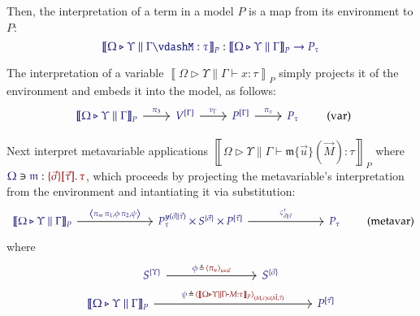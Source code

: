 \documentclass[11pt]{article}
\theoremstyle{definition}
\theoremstyle{remark}
\numberwithin{equation}{section}
\def\IModeColorName{MidnightBlue}
\def\OModeColorName{Maroon}
\newcommand\IMode[1]{{\color{\IModeColorName}{#1}}}
\newcommand\OMode[1]{{\color{\OModeColorName}{#1}}}
\newcommand\Of[2]{\IMode{#1}: \IMode{#2}}
\newcommand\MkValence[3]{%
  \ifthenelse{\equal{#1}{}}{}{%
    \{#1\}%
  }%
  \ifthenelse{\equal{#2}{}}{}{%
    [#2]%
  }.\, #3%
}
\newcommand\Lookup[3]{\IMode{#1}\ni\IMode{#2}:\OMode{#3}}
\newcommand\Tuple[1]{\left\langle#1 \right\rangle}
\newcommand\MV[1]{\mathfrak{#1}}
\newcommand\MApp[3]{#1\{#2\}(#3)}
\newcommand\Define[2]{\IMode{#1}\triangleq\OMode{#2}}
\newcommand\SemBrackets[1]{\left\llbracket#1\right\rrbracket}
\newcommand\Yoneda[1]{\boldsymbol{y} (#1)}
\begin{document}
Then, the interpretation of a term in a model $P$ is a map from its environment
to $P$:
\[%
  \Of{\SemBrackets{\Omega\triangleright\Upsilon\parallel\Gamma\vdash%
      M:\tau}_P}{\SemBrackets{\Omega\triangleright\Upsilon\parallel\Gamma}_P\to P_\tau}%
\]

The interpretation of a variable
$\SemBrackets{\Omega\triangleright\Upsilon\parallel\Gamma\vdash x:\tau}_P$ simply
projects it of the environment and embeds it into the model, as follows:
\[
  \begin{tikzcd}[ampersand replacement = \&]
    {\IMode{\SemBrackets{\Omega\triangleright\Upsilon\parallel\Gamma}_P}} \arrow[r, "\IMode{\pi_3}"]
    \& {\IMode{V^{[\Gamma]}}} \arrow[r, "\IMode{\nu_{\Gamma}}"]
    \& {\IMode{P^{[\Gamma]}}} \arrow[r, "\IMode{\pi_x}"]
    \& \IMode{P_\tau}
  \end{tikzcd}
  \tag{var}
\]

Next interpret metavariable applications
$\SemBrackets{\Omega\triangleright\Upsilon\parallel\Gamma\vdash\MApp{\MV{m}}{\vec{u}}{\vec{M}}
: \tau}_P$ where
$\Lookup{\Omega}{\MV{m}}{\MkValence{\vec{\sigma}}{\vec{\tau}}{\tau}}$, which
proceeds by projecting the metavariable's interpretation from the environment
and intantiating it via substitution:
\[
  \begin{tikzcd}[ampersand replacement = \&, sep=7em]
    {\IMode{\SemBrackets{\Omega\triangleright\Upsilon\parallel\Gamma}_P}}
          \arrow[r, "\IMode{\Tuple{\pi_\MV{m}\,\pi_1, \phi\,\pi_2, \psi}}"]
    \& {\IMode{P_{\tau}^{\Yoneda{\vec{\sigma}\parallel\vec{\tau}}}\times S^{\{\vec{\sigma}\}} \times P^{[\vec{\tau}]}}}
          \arrow[r, "\IMode{\varsigma^\tau_{\vec{\sigma}\parallel\vec{\tau}}}"]
    \& \IMode{P_\tau}
  \end{tikzcd}
  \tag{metavar}
\]
where
\begin{gather*}
  \begin{tikzcd}[ampersand replacement = \&, sep=8em]
    {\IMode{S^{\{\Upsilon\}}}} \arrow[r, "\Define{\phi\,}{\,\Tuple{\pi_u}_{u\in\vec{u}}}"]
    \& {\IMode{S^{\{\vec{\sigma}\}}}}
  \end{tikzcd}\\
  \begin{tikzcd}[ampersand replacement = \&, sep=14em]
    {\IMode{\SemBrackets{\Omega\triangleright\Upsilon\parallel\Gamma}_P}}
      \arrow[r, "\Define{\psi\,}{\,\Tuple{\SemBrackets{\Omega\triangleright\Upsilon\parallel\Gamma\vdash M:\tau}_P}_{(M,\tau)\in (\vec{M},\vec{\tau})}}"]
    \& {\IMode{P^{[\vec{\tau}]}}}
  \end{tikzcd}
\end{gather*}
\end{document}
